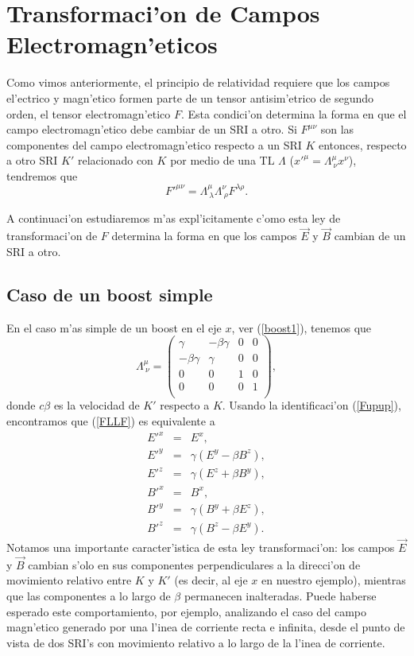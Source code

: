 \section{Transformaci'on de Campos Electromagn'eticos}
Como vimos anteriormente, el principio de relatividad requiere que los campos
el'ectrico y magn'etico formen parte de un tensor antisim'etrico de segundo
orden, el tensor electromagn'etico $F$. Esta condici'on determina la forma en
que el campo electromagn'etico debe cambiar de un SRI a otro. Si $F^{\mu\nu}$
son las componentes del campo electromagn'etico respecto a un SRI $K$ entonces,
respecto a otro SRI $K'$ relacionado con $K$ por medio de una TL $\Lambda$
($x'^\mu=\Lambda^\mu_{\  \nu}x^\nu$), tendremos que
\begin{equation}
F'^{\mu\nu}=\Lambda^\mu_{\ \lambda}\Lambda^\nu_{\ \rho}F^{\lambda\rho}.
\label{FLLF}
\end{equation}

A continuaci'on estudiaremos m'as expl'icitamente c'omo esta ley de transformaci'on de $F$ determina
la forma en que los campos $\vec{E}$ y $\vec{B}$ cambian de un SRI a otro.

\subsection{Caso de un boost simple}
En el caso m'as simple de un boost en el eje $x$, ver (\ref{boost1}), tenemos
que
\begin{equation}
\Lambda^\mu_{\ \nu}=\left( \begin{array}{cccc}
\gamma & -\beta\gamma & 0 & 0\\
-\beta\gamma & \gamma & 0 & 0\\
0 & 0 & 1 & 0\\
0 & 0 & 0 & 1\\
\end{array}\right) ,
\end{equation}
donde $c\beta$ es la velocidad de $K'$ respecto a $K$. Usando la identificaci'on
(\ref{Fupup}), encontramos que (\ref{FLLF}) es equivalente a
\begin{eqnarray}
E'^x &=& E^x ,\\
E'^y &=& \gamma ( E^y - \beta B^z ) ,\\
E'^z &=& \gamma ( E^z + \beta B^y ) ,\\
B'^x &=& B^x ,\\
B'^y &=& \gamma (B^y + \beta E^z) ,\\
B'^z &=& \gamma (B^z - \beta E^y).
\end{eqnarray}
Notamos una importante caracter'istica de esta ley transformaci'on: los campos
$\vec{E}$ y $\vec{B}$ cambian s'olo en sus componentes perpendiculares a la
direcci'on de movimiento relativo entre $K$ y $K'$ (es decir, al eje $x$ en
nuestro ejemplo), mientras que las componentes a lo largo de $\beta$ permanecen
inalteradas. Puede haberse esperado este comportamiento, por ejemplo,
analizando el caso del campo magn'etico generado por una l'inea de corriente
recta e infinita, desde el punto de vista de dos SRI's con movimiento relativo a
lo largo de la l'inea de corriente.


